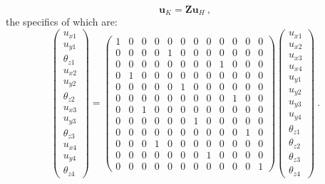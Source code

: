 \begin{equation} 
\mathbf{u}_{K} = \mathbf{Z} \mathbf{u}_{H} 
\label{equation11_2}\ ,
\end{equation}
the specifics of which are:
\begin{equation} 
\begin{pmatrix}
u_{x1} \\
u_{y1} \\
\theta_{z1} \\
u_{x2} \\
u_{y2} \\
\theta_{z2} \\
u_{x3} \\
u_{y3} \\
\theta_{z3} \\
u_{x4} \\
u_{y4} \\
\theta_{z4} 
\end{pmatrix}
=
\begin{pmatrix}
1 & 0 & 0 & 0 & 0 & 0 & 0 & 0 & 0 & 0 & 0 & 0 \\
0 & 0 & 0 & 0 & 1 & 0 & 0 & 0 & 0 & 0 & 0 & 0 \\
0 & 0 & 0 & 0 & 0 & 0 & 0 & 0 & 1 & 0 & 0 & 0 \\
0 & 1 & 0 & 0 & 0 & 0 & 0 & 0 & 0 & 0 & 0 & 0 \\
0 & 0 & 0 & 0 & 0 & 1 & 0 & 0 & 0 & 0 & 0 & 0 \\
0 & 0 & 0 & 0 & 0 & 0 & 0 & 0 & 0 & 1 & 0 & 0 \\
0 & 0 & 1 & 0 & 0 & 0 & 0 & 0 & 0 & 0 & 0 & 0 \\
0 & 0 & 0 & 0 & 0 & 0 & 1 & 0 & 0 & 0 & 0 & 0 \\
0 & 0 & 0 & 0 & 0 & 0 & 0 & 0 & 0 & 0 & 1 & 0 \\
0 & 0 & 0 & 1 & 0 & 0 & 0 & 0 & 0 & 0 & 0 & 0 \\
0 & 0 & 0 & 0 & 0 & 0 & 0 & 1 & 0 & 0 & 0 & 0 \\
0 & 0 & 0 & 0 & 0 & 0 & 0 & 0 & 0 & 0 & 0 & 1
\end{pmatrix}
\begin{pmatrix}
u_{x1} \\
u_{x2} \\
u_{x3} \\
u_{x4} \\
u_{y1} \\
u_{y2} \\
u_{y3} \\
u_{y4} \\
\theta_{z1} \\
\theta_{z2}  \\
\theta_{z3}  \\
\theta_{z4} 
\end{pmatrix}
\label{equation18_2}\ .
\end{equation}

